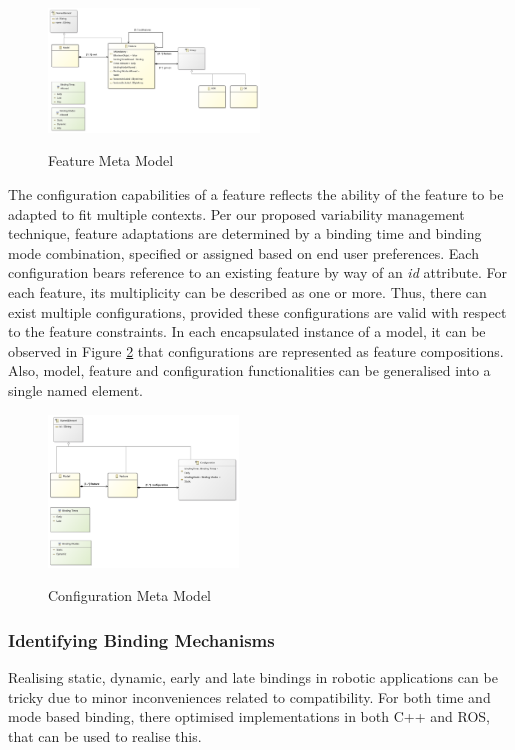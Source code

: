 \documentclass[conference]{IEEEtran}
\begin{document}
\begin{figure}[H]
\caption{Feature Meta Model}
\centering
\includegraphics[width=0.5\textwidth]{diagrams/feature.png}
\label{femet}
\end{figure}

The configuration capabilities of a feature reflects the ability of the feature to be adapted to fit multiple contexts. Per our proposed variability management technique,
feature adaptations are determined by a binding time and binding mode combination, specified or assigned based on end user preferences. Each configuration bears reference to an existing feature by way of an \textit{id} attribute. For each feature, its multiplicity can be described as one or more. Thus, there can exist multiple configurations, provided these configurations are valid with respect to the feature constraints. In each encapsulated instance of a model, it can be observed in Figure \ref{conmet} that configurations are represented as feature compositions. Also, model, feature and configuration functionalities can be generalised into a single named element. 

\begin{figure}[H]
\caption{Configuration Meta Model}
\centering
\includegraphics[width=0.45\textwidth]{diagrams/config.png}
\label{conmet}
\end{figure}

\subsubsection{Identifying Binding Mechanisms}
Realising static, dynamic, early and late bindings in robotic applications can be tricky due to minor inconveniences related to compatibility. For both time and mode based binding, there optimised implementations in both C++ and ROS, that can be used to realise this.
\end{document}
